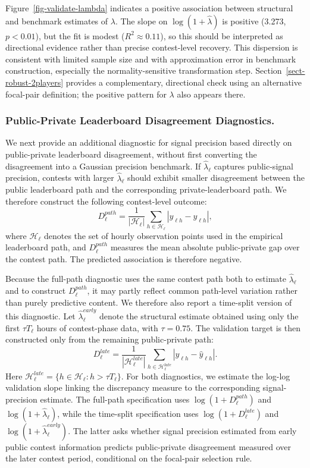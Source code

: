\documentclass[mnsc]{informs3}
\begin{document}
Figure~\ref{fig-validate-lambda} indicates a positive association between structural and benchmark estimates of $\lambda$.
The slope on $\log(1+\hat\lambda)$ is positive (3.273, $p<0.01$), but the fit is modest ($R^2\approx0.11$), so this should be interpreted as directional evidence rather than precise contest-level recovery.
This dispersion is consistent with limited sample size and with approximation error in benchmark construction, especially the normality-sensitive transformation step.
Section~\ref{sect-robust-2players} provides a complementary, directional check using an alternative focal-pair definition; the positive pattern for $\lambda$ also appears there.


\subsubsection{Public-Private Leaderboard Disagreement Diagnostics.}
We next provide an additional diagnostic for signal precision based directly on public-private leaderboard disagreement, without first converting the disagreement into a Gaussian precision benchmark.
If $\hat\lambda_\ell$ captures public-signal precision, contests with larger $\hat\lambda_\ell$ should exhibit smaller disagreement between the public leaderboard path and the corresponding private-leaderboard path.
We therefore construct the following contest-level outcome:
\[
D_\ell^{path}
=
\frac{1}{|\mathcal H_\ell|}
\sum_{h\in\mathcal H_\ell}
\left|y_{\ell h}-\hat y_{\ell h}\right|,
\]
where $\mathcal H_\ell$ denotes the set of hourly observation points used in the empirical leaderboard path, and $D_\ell^{path}$ measures the mean absolute public-private gap over the contest path.
The predicted association is therefore negative.

Because the full-path diagnostic uses the same contest path both to estimate $\hat\lambda_\ell$ and to construct $D_\ell^{path}$, it may partly reflect common path-level variation rather than purely predictive content.
We therefore also report a time-split version of this diagnostic.
Let $\hat\lambda_\ell^{early}$ denote the structural estimate obtained using only the first $\tau T_\ell$ hours of contest-phase data, with $\tau=0.75$.
The validation target is then constructed only from the remaining public-private path:
\[
D_\ell^{late}
=
\frac{1}{|\mathcal H_\ell^{late}|}
\sum_{h\in\mathcal H_\ell^{late}}
\left|y_{\ell h}-\hat y_{\ell h}\right|.
\]
Here $\mathcal H_\ell^{late}=\{h\in\mathcal H_\ell:h>\tau T_\ell\}$.
For both diagnostics, we estimate the log-log validation slope linking the discrepancy measure to the corresponding signal-precision estimate.
The full-path specification uses $\log(1+D_\ell^{path})$ and $\log(1+\hat\lambda_\ell)$, while the time-split specification uses $\log(1+D_\ell^{late})$ and $\log(1+\hat\lambda_\ell^{early})$.
The latter asks whether signal precision estimated from early public contest information predicts public-private disagreement measured over the later contest period, conditional on the focal-pair selection rule.
\end{document}
